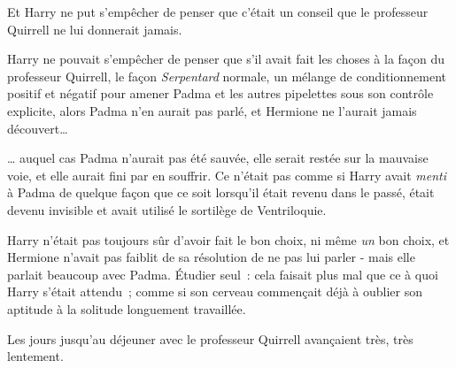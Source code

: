 Et Harry ne put s'empêcher de penser que c'était un conseil que le professeur Quirrell ne lui donnerait jamais.

Harry ne pouvait s'empêcher de penser que s'il avait fait les choses à la façon du professeur Quirrell, le façon \emph{Serpentard} normale, un mélange de conditionnement positif et négatif pour amener Padma et les autres pipelettes sous son contrôle explicite, alors Padma n'en aurait pas parlé, et Hermione ne l'aurait jamais découvert…

… auquel cas Padma n'aurait pas été sauvée, elle serait restée sur la mauvaise voie, et elle aurait fini par en souffrir. Ce n'était pas comme si Harry avait \emph{menti} à Padma de quelque façon que ce soit lorsqu'il était revenu dans le passé, était devenu invisible et avait utilisé le sortilège de Ventriloquie.

Harry n'était pas toujours sûr d'avoir fait le bon choix, ni même \emph{un} bon choix, et Hermione n'avait pas faiblit de sa résolution de ne pas lui parler - mais elle parlait beaucoup avec Padma. Étudier seul~: cela faisait plus mal que ce à quoi Harry s'était attendu~; comme si son cerveau commençait déjà à oublier son aptitude à la solitude longuement travaillée.

Les jours jusqu'au déjeuner avec le professeur Quirrell avançaient très, très lentement.

